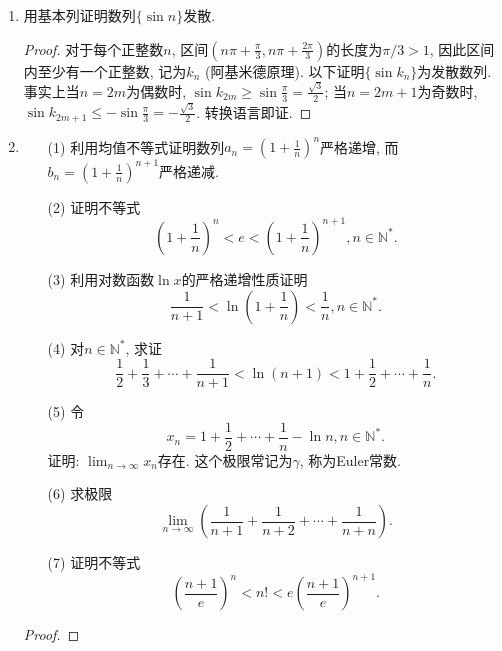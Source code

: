 \documentclass[UTF8,11pt, a4paper, oneside, fontset=none]{ctexbook}
\begin{document}
\begin{enumerate}
\begin{proof}

构造辅助数列$b_{n+1} = a_{n+1} - \frac{1}{2^n}$, 则$b_{n+1} \geq b_n$. 由于$\{a_n\}$有界, $\{b_n\}$一定有界. 因此$\{ b_n\}$收敛, 再得到数列$\{a_n\}$收敛.


\end{proof}

\item 用基本列证明数列$\{ \sin n \}$发散.


\begin{proof}

对于每个正整数$n$, 区间$(n \pi + \frac{\pi}{3}, n \pi + \frac{2\pi}{3})$的长度为$\pi/3 >1$, 因此区间内至少有一个正整数, 记为$k_n$ (阿基米德原理). 以下证明$\{ \sin k_n \}$为发散数列. 事实上当$n=2m$为偶数时, $\sin k_{2m} \geq \sin \frac{\pi}{3} = \frac{\sqrt 3}{2}$; 当$n=2m+1$为奇数时, $\sin k_{2m+1} \leq -\sin \frac{\pi}{3} = -\frac{\sqrt 3}{2}$. 转换语言即证.

\end{proof}


\item
\begin{itemize}
\item[(1)] 利用均值不等式证明数列$a_n = \left( 1 + \frac{1}{n}\right)^n$严格递增, 而$b_n = \left( 1 + \frac{1}{n}\right)^{n+1}$严格递减.
\item[(2)] 证明不等式
\[
\left( 1 + \frac{1}{n}\right)^n < e < \left( 1 + \frac{1}{n}\right)^{n+1}, n \in \mathbb N^*.
\]
\item[(3)] 利用对数函数$\ln x$的严格递增性质证明
\[
\frac{1}{n+1} < \ln(1 + \frac{1}{n}) < \frac{1}{n}, n \in \mathbb N^*.
\]
\item[(4)] 对$n \in \mathbb N^*$, 求证
\[
\frac{1}{2} + \frac{1}{3} + \cdots + \frac{1}{n+1} < \ln(n+1) < 1 + \frac{1}{2} + \cdots + \frac{1}{n}.
\]
\item[(5)] 令
\[
x_n = 1 + \frac{1}{2} + \cdots +\frac{1}{n} - \ln n, n \in \mathbb N^*.
\]
证明: $\lim_{n \to \infty} x_n$存在. 这个极限常记为$\gamma$, 称为Euler常数.
\item[(6)] 求极限
\[
\lim_{n \to \infty} \left( \frac{1}{n+1} + \frac{1}{n+2} + \cdots + \frac{1}{n+n}\right).
\]
\item[(7)] 证明不等式
\[
\left( \frac{n+1}{e} \right)^n < n! < e \left( \frac{n+1}{e} \right)^{n+1}.
\]
\end{itemize}


\begin{proof}


\end{proof}
\end{enumerate}
\end{document}
